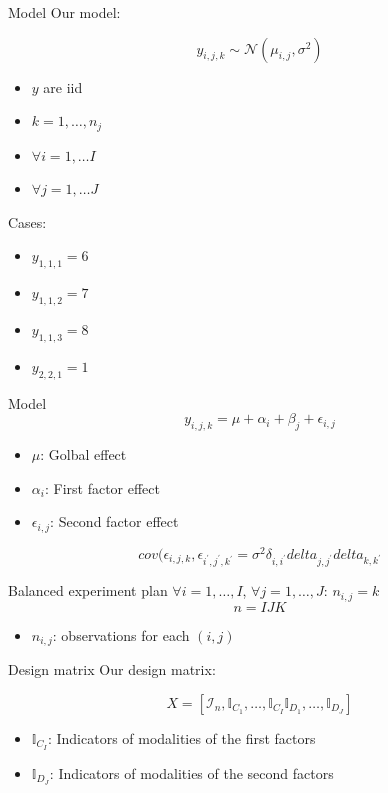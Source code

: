 \documentclass[unknownkeysallowed]{beamer}
\begin{document}
\begin{frame}{Model}
Our model:

$$
y_{i,j,k}\sim \mathcal{N}(\mu_{i,j},\sigma^2)
$$
\begin{itemize}
    \item $y$ are iid 
    \item $k=1,\dots,n_j$
    \item $\forall i= 1,\dots I$
    \item $\forall j= 1,\dots J$
\end{itemize}
Cases:
\begin{itemize}
    \item $y_{1,1,1}=6$
    \item $y_{1,1,2}=7$
    \item $y_{1,1,3}=8$
    \item $y_{2,2,1}=1$
\end{itemize}
\end{frame}

\begin{frame}{Model}
$$
y_{i,j,k}=\mu + \alpha_i +\beta_j + \epsilon_{i,j}
$$

\begin{itemize}
    \item $\mu$: Golbal effect
    \item $\alpha_i$: First factor effect
    \item $\epsilon_{i,j}$: Second factor effect
\end{itemize}

$$
cov(\epsilon_{i,j,k},\epsilon_{i^\prime,j^\prime,k^\prime}=\sigma^2\delta_{i,i^\prime}delta_{j,j^\prime}delta_{k,k^\prime}
$$
\end{frame}

\begin{frame}{Balanced experiment plan}
$\forall i=1,\dots,I$, $\forall j=1,\dots,J$: $n_{i,j}=k$
$$
n=IJK
$$
\begin{itemize}
    \item $n_{i,j}$: observations for each $(i,j)$
\end{itemize}
\end{frame}

\begin{frame}{Design matrix}
Our design matrix:

$$
X=[\mathcal{I}_n,\mathbb{I}_{C_1},\dots,\mathbb{I}_{C_I}\mathbb{I}_{D_1},\dots,\mathbb{I}_{D_J}]
$$

\begin{itemize}
    \item $\mathbb{I}_{C_I}$: Indicators of modalities of the first factors
    \item $\mathbb{I}_{D_J}$: Indicators of modalities of the second factors
\end{itemize}
\end{frame}
\end{document}
